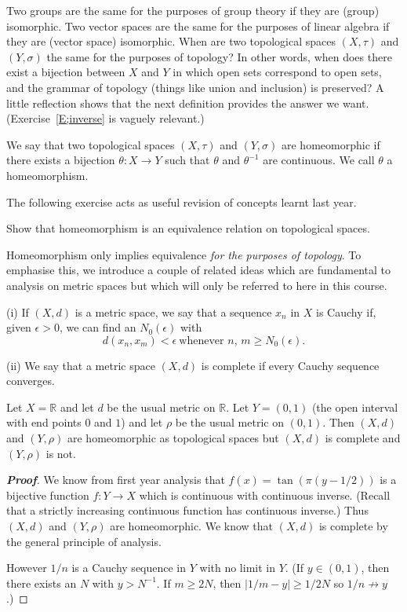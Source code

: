 Two groups are the same for the purposes of group theory if they are (group) isomorphic. Two vector spaces are the same for the purposes of linear algebra if they are (vector space) isomorphic. When
are two topological spaces $(X,\tau)$ and $(Y,\sigma)$ the same for the purposes of topology? In other words, when does there exist a bijection between $X$ and $Y$ in which open sets correspond to
open sets, and the grammar of topology (things like union and inclusion) is preserved? A little reflection shows that the next definition provides the answer we want. (Exercise~\ref{E;inverse} is
vaguely relevant.)
\begin{definition}\label{D;homeomorphisms}
We say that two topological spaces
$(X,\tau)$ and $(Y,\sigma)$ are homeomorphic if there
exists a bijection
$\theta:X\rightarrow Y$ such that $\theta$ and $\theta^{-1}$
are continuous. We call $\theta$ a homeomorphism.
\end{definition}
The following exercise acts as useful revision of concepts
learnt last year.
\begin{problem} Show that homeomorphism is an equivalence
relation on topological spaces.
\end{problem}
Homeomorphism only implies
equivalence\label{R;topological properties}
\emph{for the purposes of topology}.
To emphasise this, we introduce a couple of related ideas which are
fundamental to analysis on metric spaces but which will
only be referred to here in this course.
\begin{definition}\label{D;completeness}
(i) If $(X,d)$ is a metric space,
we say that a sequence $x_{n}$ in $X$ is Cauchy if, given
$\epsilon>0$, we can find an $N_{0}(\epsilon)$ with
\[d(x_{n},x_{m})<\epsilon\ \text{whenever $n,\,m\geq N_{0}(\epsilon)$}.\]

(ii) We say that a metric space $(X,d)$ is complete if every Cauchy sequence converges.
\end{definition}

\begin{theorem}\label{T;Cauchy not topological}
Let $X={\mathbb R}$ and let $d$ be the usual metric on ${\mathbb R}$.
Let $Y=(0,1)$ (the open interval with end points $0$ and $1$)
and let $\rho$ be the usual metric on $(0,1)$. Then
$(X,d)$ and $(Y,\rho)$ are homeomorphic as topological spaces
but $(X,d)$ is complete and $(Y,\rho)$ is not.
\end{theorem}
\begin{proof}[\bf Proof] We know from first year analysis that
$f(x)=\tan(\pi(y-1/2))$ is a bijective function $f:Y\rightarrow X$
which is continuous with continuous inverse. (Recall that a strictly increasing
continuous function has continuous inverse.)  Thus
$(X,d)$ and $(Y,\rho)$ are homeomorphic. We know that
$(X,d)$ is complete by the general principle of analysis.

However $1/n$ is a Cauchy sequence in $Y$ with no limit in $Y$. (If $y\in (0,1)$, then there exists an $N$ with $y>N^{-1}$. If $m\geq 2N$, then $|1/m-y|\geq 1/2N$ so $1/n\nrightarrow y$.)
\end{proof}

